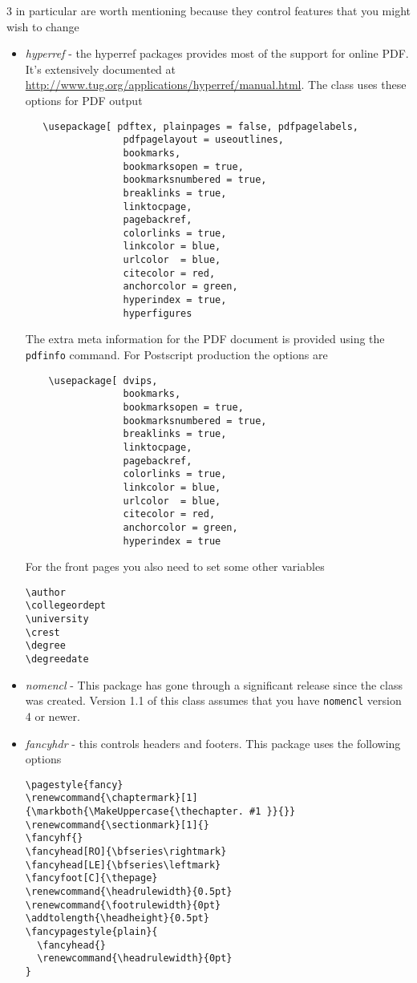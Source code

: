 \documentclass{article}
\begin{document}
 3 in particular are worth mentioning
because they control features that you might wish to change
\begin{itemize}
\item \textit{hyperref} - the hyperref packages provides most of 
the support for online PDF. It's extensively documented at \url{http://www.tug.org/applications/hyperref/manual.html}.
The class uses these options for PDF output
\begin{verbatim}
   \usepackage[ pdftex, plainpages = false, pdfpagelabels,
                 pdfpagelayout = useoutlines,
                 bookmarks,
                 bookmarksopen = true,
                 bookmarksnumbered = true,
                 breaklinks = true,
                 linktocpage,
                 pagebackref,
                 colorlinks = true,
                 linkcolor = blue,
                 urlcolor  = blue,
                 citecolor = red,
                 anchorcolor = green,
                 hyperindex = true,
                 hyperfigures
\end{verbatim}
The extra meta information for the PDF document is provided using
the \verb|pdfinfo| command. For Postscript production the options are

\begin{verbatim}
    \usepackage[ dvips,
                 bookmarks,
                 bookmarksopen = true,
                 bookmarksnumbered = true,
                 breaklinks = true,
                 linktocpage,
                 pagebackref,
                 colorlinks = true,
                 linkcolor = blue,
                 urlcolor  = blue,
                 citecolor = red,
                 anchorcolor = green,
                 hyperindex = true
\end{verbatim}

For the front pages you also need to set some other variables
\begin{verbatim}
\author
\collegeordept
\university
\crest
\degree
\degreedate
\end{verbatim}


\item \textit{nomencl} -
This package has gone through a significant release since the class was created.
Version 1.1 of this class assumes that you have \texttt{nomencl} version 4 or newer.

\item \textit{fancyhdr} - this controls headers and footers. This
package uses the following options
\begin{verbatim}
\pagestyle{fancy}
\renewcommand{\chaptermark}[1]{\markboth{\MakeUppercase{\thechapter. #1 }}{}}
\renewcommand{\sectionmark}[1]{}
\fancyhf{}
\fancyhead[RO]{\bfseries\rightmark}
\fancyhead[LE]{\bfseries\leftmark}
\fancyfoot[C]{\thepage}
\renewcommand{\headrulewidth}{0.5pt}
\renewcommand{\footrulewidth}{0pt}
\addtolength{\headheight}{0.5pt}
\fancypagestyle{plain}{
  \fancyhead{}
  \renewcommand{\headrulewidth}{0pt}
}
\end{verbatim}
\end{itemize}
\end{document}
